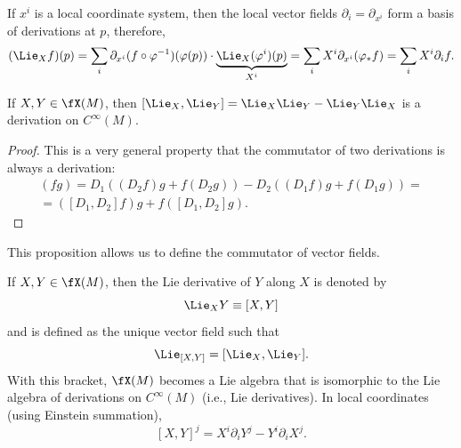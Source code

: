 \begin{cor}
    If $x^i$ is a local coordinate system, then the local vector fields $\partial_i=\partial_{x^i}$ form a basis of derivations at $p$, therefore, 
    \[(\Lie_X f)(p)=\sum_i \partial_{x^i}(f\circ\varphi^{-1})(\varphi(p))\cdot \underbrace{\Lie_X (\varphi^i)(p)}_{X^i}=\sum_i X^i \partial_{x^i}(\varphi_\ast f)=\sum_i X^i \partial_{i} f.\]
\end{cor}

\begin{prop}
    If $X,Y\in\fX(M)$, then $[\Lie_X,\Lie_Y]=\Lie_X\Lie_Y-\Lie_Y\Lie_X$ is a derivation on $C^\infty(M)$.
\end{prop}
\begin{proof}
    This is a very general property that the commutator of two derivations is always a derivation:
    \begin{multline}
        [D_1,D_2](fg)=D_1((D_2f)g+f(D_2g))-D_2((D_1f)g+f(D_1g))=\\=([D_1,D_2]f)g+f([D_1,D_2]g).
    \end{multline}
\end{proof}

This proposition allows us to define the commutator of vector fields.

\begin{defn}
    If $X,Y\in\fX(M)$, then the Lie derivative of $Y$ along $X$ is denoted by 
    \[\Lie_X Y\equiv [X,Y]\] and is defined as the unique vector field such that
    \[\Lie_{[X,Y]}=[\Lie_X,\Lie_Y].\]
    With this bracket, $\fX(M)$ becomes a Lie algebra that is isomorphic to the Lie algebra of derivations on $C^\infty(M)$ (i.e., Lie derivatives).
    In local coordinates (using Einstein summation),
    \[[X,Y]^j=X^i \partial_i Y^j-Y^i \partial_i X^j.\label{eq Lie derivative in components}\]
\end{defn}

